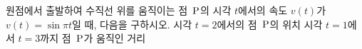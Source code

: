 원점에서 출발하여 수직선 위를 움직이는 점~$\mathrm{P}$의 시각 $t$에서의 속도 $v(t)$가 $v(t)=\sin \pi t$일 때, 다음을 구하시오.
 시각 $t=2$에서의 점~$\mathrm{P}$의 위치
 시각 $t=1$에서 $t=3$까지 점~$\mathrm{P}$가 움직인 거리
